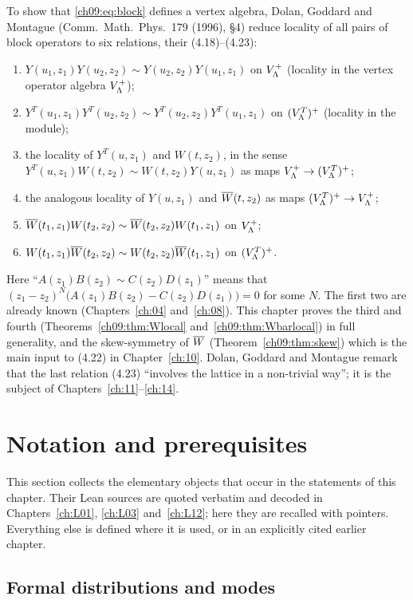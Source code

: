 To show that \eqref{ch09:eq:block} defines a vertex algebra, Dolan, Goddard and Montague
(Comm.\ Math.\ Phys.\ 179 (1996), \S4) reduce locality of all pairs of block operators to six
relations, their (4.18)--(4.23):
\begin{enumerate}
\item $Y(u_1,z_1)Y(u_2,z_2)\sim Y(u_2,z_2)Y(u_1,z_1)$ on $V_{\Lambda}^{+}$ (locality in the vertex
operator algebra $V_{\Lambda}^{+}$);
\item $Y^T(u_1,z_1)Y^T(u_2,z_2)\sim Y^T(u_2,z_2)Y^T(u_1,z_1)$ on $(V_{\Lambda}^{T})^{+}$ (locality in the
module);
\item the locality of $Y^T(u,z_1)$ and $W(t,z_2)$, in the sense
$Y^T(u,z_1)W(t,z_2)\sim W(t,z_2)Y(u,z_1)$ as maps $V_{\Lambda}^{+}\to(V_{\Lambda}^{T})^{+}$;
\item the analogous locality of $Y(u,z_1)$ and $\overline{W}(t,z_2)$ as maps $(V_{\Lambda}^{T})^{+}\to V_{\Lambda}^{+}$;
\item[(4.22)] $\overline{W}(t_1,z_1)W(t_2,z_2)\sim\overline{W}(t_2,z_2)W(t_1,z_1)$ on $V_{\Lambda}^{+}$;
\item[(4.23)] $W(t_1,z_1)\overline{W}(t_2,z_2)\sim W(t_2,z_2)\overline{W}(t_1,z_1)$ on $(V_{\Lambda}^{T})^{+}$.
\end{enumerate}
Here ``$A(z_1)B(z_2)\sim C(z_2)D(z_1)$'' means that $(z_1-z_2)^N\big(A(z_1)B(z_2)-C(z_2)D(z_1)\big)=0$
for some $N$. The first two are already known (Chapters~\ref{ch:04} and~\ref{ch:08}). This
chapter proves the third and fourth (Theorems~\ref{ch09:thm:Wlocal} and~\ref{ch09:thm:Wbarlocal})
in full generality, and the skew-symmetry of $\overline{W}$ (Theorem~\ref{ch09:thm:skew}) which is
the main input to (4.22) in Chapter~\ref{ch:10}. Dolan, Goddard and Montague remark that the last
relation (4.23) ``involves the lattice in a non-trivial way''; it is the subject of
Chapters~\ref{ch:11}--\ref{ch:14}.

\section{Notation and prerequisites}\label{ch09:sec:notation}

This section collects the elementary objects that occur in the statements of this chapter. Their
Lean sources are quoted verbatim and decoded in Chapters~\ref{ch:L01}, \ref{ch:L03}
and~\ref{ch:L12}; here they are recalled with pointers. Everything else is defined where it is
used, or in an explicitly cited earlier chapter.

\subsection{Formal distributions and modes}

